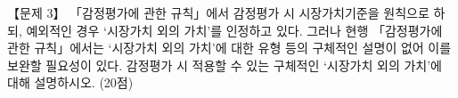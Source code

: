 \begin{longquestion}{【문제 3】}
「감정평가에 관한 규칙」에서 감정평가 시 시장가치기준을 원칙으로 하되, 예외적인 경우 ‘시장가치 외의 가치’를 인정하고 있다. 그러나 현행 「감정평가에 관한 규칙」에서는 ‘시장가치 외의 가치’에 대한 유형 등의 구체적인 설명이 없어 이를 보완할 필요성이 있다. 감정평가 시 적용할 수 있는 구체적인 ‘시장가치 외의 가치’에 대해 설명하시오. (20점) \par
\end{longquestion}
